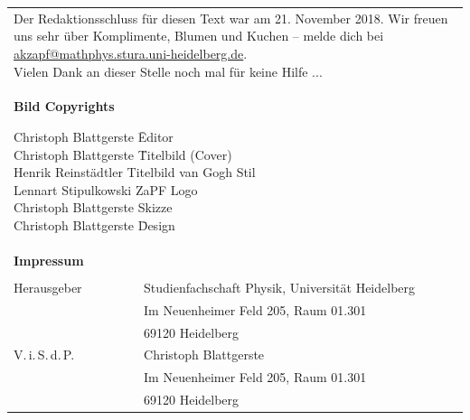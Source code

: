 \documentclass{scrbook}
\begin{document}
\null
\newpage
{}
\vspace*{\fill}
    \begin{tabular*}{\textwidth}{ll}
        \multicolumn{2}{l}{
            \parbox{\textwidth}{
                Der Redaktionsschluss für diesen Text war am 21. November 2018. Wir freuen uns
                sehr über Komplimente, Blumen und Kuchen -- melde dich bei
                \href{mailto:akzapf@mathphys.stura.uni-heidelberg.de}{akzapf@mathphys.stura.uni-heidelberg.de}. \\
                Vielen Dank an dieser Stelle noch mal für keine Hilfe ... 
            }
            \vspace{1cm}
        }\\
	\multicolumn{2}{l}{
	\parbox{0.77\textwidth}{
       	\textbf{Bild Copyrights}
       	\begin{tabbing}
        Christoph Blattgerste \quad \quad \= Editor \\
		Christoph Blattgerste \quad \quad \=  Titelbild (Cover) \\		
		Henrik Reinstädtler\> Titelbild van Gogh Stil \\
		Lennart Stipulkowski \> ZaPF Logo \\
		Christoph Blattgerste\footnotemark \> Skizze \\
        Christoph Blattgerste \quad \quad \= Design	
		\end{tabbing}
       	}
      }\\  

        \textbf{Impressum} \\ \\
        Herausgeber & Studienfachschaft Physik, Universität Heidelberg \\
        & Im Neuenheimer Feld 205, Raum 01.301\\
        & 69120 Heidelberg\\
        V.\,i.\,S.\,d.\,P. & Christoph Blattgerste\\
        & Im Neuenheimer Feld 205, Raum 01.301\\
        & 69120 Heidelberg\\
    \end{tabular*}

    \vfill
\end{document}
